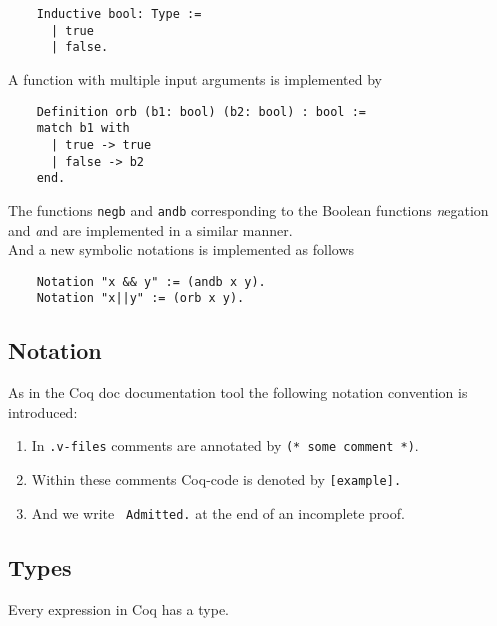     \label{Def:booleans}
    \begin{lstlisting}    
    Inductive bool: Type :=
      | true
      | false.
    \end{lstlisting}
     A function with multiple input arguments is implemented by
    \begin{lstlisting}
    Definition orb (b1: bool) (b2: bool) : bool :=
    match b1 with
	  | true -> true
	  | false -> b2
    end.
    \end{lstlisting}    
    The functions \lstinline!negb! and \lstinline!andb! corresponding to the Boolean functions {\emph negation} and {\emph and} are implemented in a similar manner.\\   
    And a new symbolic notations is implemented as follows
    \begin{lstlisting}
    Notation "x && y" := (andb x y).
    Notation "x||y" := (orb x y).
    \end{lstlisting}
    
     
\subsection{Notation}
    As in the Coq doc documentation tool the following notation convention is introduced:
     
    \begin{enumerate}
     \item In \texttt{.v-files} comments are annotated by \lstinline!(* some comment *)!. 
     \item Within these comments Coq-code is denoted by \lstinline![example].! 
     \item And we write \lstinline! Admitted.! at the end of an incomplete proof.    
     \end{enumerate}
     
     
\subsection{Types}
     Every expression in Coq has a type.
   
